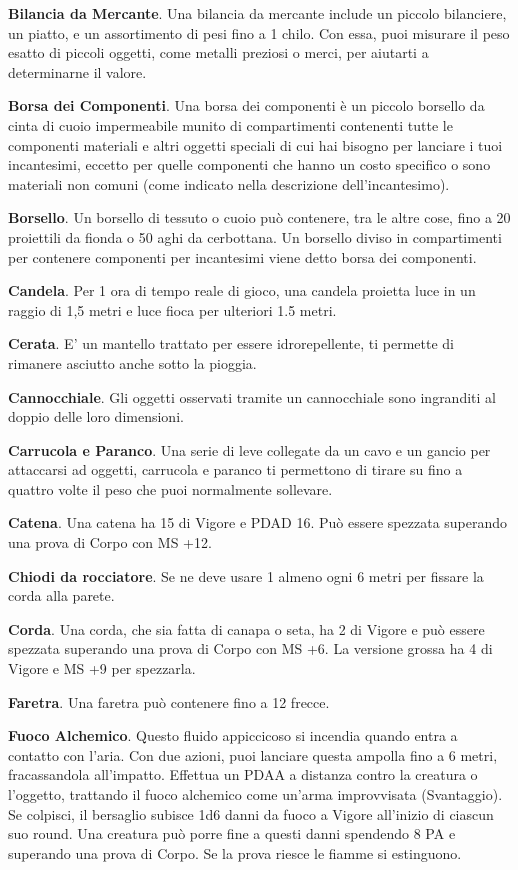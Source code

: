 \documentclass[12pt,a4paper,twoside,openany]{book}
\begin{document}
\begin{multicols}{2}
\textbf{Bilancia da Mercante}. Una bilancia da mercante include un piccolo bilanciere, un piatto, e un assortimento di pesi fino a 1 chilo. Con essa, puoi misurare il peso esatto di piccoli oggetti, come metalli preziosi o merci, per aiutarti a determinarne il valore.

\textbf{Borsa dei Componenti}. Una borsa dei componenti è un piccolo borsello da cinta di cuoio impermeabile munito di compartimenti contenenti tutte le componenti materiali e altri oggetti speciali di cui hai bisogno per lanciare i tuoi incantesimi, eccetto per quelle componenti che hanno un costo specifico o sono materiali non comuni (come indicato nella descrizione dell’incantesimo).

\textbf{Borsello}. Un borsello di tessuto o cuoio può contenere, tra le altre cose, fino a 20 proiettili da fionda o 50 aghi da cerbottana. Un borsello diviso in compartimenti per contenere componenti per incantesimi viene detto borsa dei componenti.

\textbf{Candela}. Per 1 ora di tempo reale di gioco, una candela proietta luce in un raggio di 1,5 metri e luce fioca per ulteriori 1.5 metri.

\textbf{Cerata}. E' un mantello trattato per essere idrorepellente, ti permette di rimanere asciutto anche sotto la pioggia.

\textbf{Cannocchiale}. Gli oggetti osservati tramite un cannocchiale sono ingranditi al doppio delle loro dimensioni.

\textbf{Carrucola e Paranco}. Una serie di leve collegate da un cavo e un gancio per attaccarsi ad oggetti, carrucola e paranco ti permettono di tirare su fino a quattro volte il
peso che puoi normalmente sollevare.

\textbf{Catena}. Una catena ha 15 di Vigore e PDAD 16. Può essere spezzata superando una prova di Corpo con MS +12.

\textbf{Chiodi da rocciatore}. Se ne deve usare 1 almeno ogni 6 metri per fissare la corda alla parete.

\textbf{Corda}. Una corda, che sia fatta di canapa o seta, ha 2 di Vigore e può essere spezzata superando una prova di Corpo con MS +6. La versione grossa ha 4 di Vigore e MS +9 per spezzarla.

\textbf{Faretra}. Una faretra può contenere fino a 12 frecce.

\textbf{Fuoco Alchemico}. Questo fluido appiccicoso si incendia quando entra a contatto con l’aria. Con due azioni, puoi lanciare questa ampolla fino a 6 metri, fracassandola all’impatto. Effettua un PDAA a distanza contro la creatura o l’oggetto, trattando il fuoco alchemico come un’arma improvvisata (Svantaggio). Se colpisci, il bersaglio subisce 1d6 danni da fuoco a Vigore all’inizio di ciascun suo round. Una creatura può porre fine a questi danni spendendo 8 PA e superando una prova di Corpo. Se la prova riesce le fiamme si estinguono.


\end{multicols}
\end{document}

